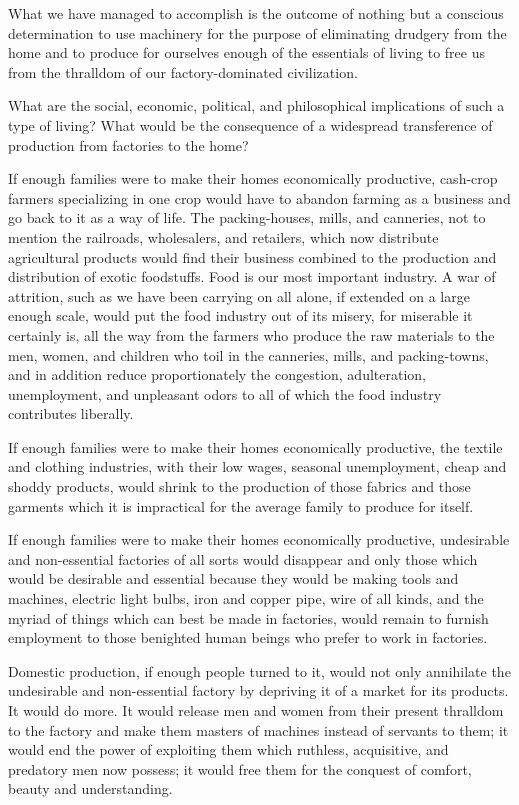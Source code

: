 \documentclass{book}
\begin{document}
What we have managed to accomplish is the outcome of nothing but a conscious determination to use machinery for the purpose of eliminating drudgery from the home and to produce for ourselves enough of the essentials of living to free us from the thralldom of our factory-dominated civilization.

What are the social, economic, political, and philosophical implications of such a type of living? What would be the consequence of a widespread transference of production from factories to the home?

If enough families were to make their homes economically productive, cash-crop farmers specializing in one crop would have to abandon farming as a business and go back to it as a way of life. The packing-houses, mills, and canneries, not to mention the railroads, wholesalers, and retailers, which now distribute agricultural products would find their business combined to the production and distribution of exotic foodstuffs. Food is our most important industry. A war of attrition, such as we have been carrying on all alone, if extended on a large enough scale, would put the food industry out of its misery, for miserable it certainly is, all the way from the farmers who produce the raw materials to the men, women, and children who toil in the canneries, mills, and packing-towns, and in addition reduce proportionately the congestion, adulteration, unemployment, and unpleasant odors to all of which the food industry contributes liberally.

If enough families were to make their homes economically productive, the textile and clothing industries, with their low wages, seasonal unemployment, cheap and shoddy products, would shrink to the production of those fabrics and those garments which it is impractical for the average family to produce for itself.

If enough families were to make their homes economically productive, undesirable and non-essential factories of all sorts would disappear and only those which would be desirable and essential because they would be making tools and machines, electric light bulbs, iron and copper pipe, wire of all kinds, and the myriad of things which can best be made in factories, would remain to furnish employment to those benighted human beings who prefer to work in factories.

Domestic production, if enough people turned to it, would not only annihilate the undesirable and non-essential factory by depriving it of a market for its products. It would do more. It would release men and women from their present thralldom to the factory and make them masters of machines instead of servants to them; it would end the power of exploiting them which ruthless, acquisitive, and predatory men now possess; it would free them for the conquest of comfort, beauty and understanding.
\end{document}
